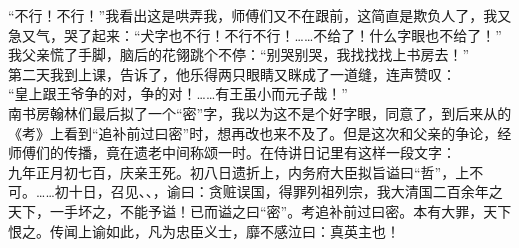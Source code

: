 “不行！不行！”我看出这是哄弄我，师傅们又不在跟前，这简直是欺负人了，我又急又气，哭了起来：“犬字也不行！不行不行！……不给了！什么字眼也不给了！”\\

我父亲慌了手脚，脑后的花翎跳个不停：“别哭别哭，我找找找上书房去！”\\

第二天我到上课，告诉了，他乐得两只眼睛又眯成了一道缝，连声赞叹：\\

“皇上跟王爷争的对，争的对！……有王虽小而元子哉！”\\

南书房翰林们最后拟了一个“密”字，我以为这不是个好字眼，同意了，到后来从的《考》上看到“追补前过曰密”时，想再改也来不及了。但是这次和父亲的争论，经师傅们的传播，竟在遗老中间称颂一时。在侍讲日记里有这样一段文字：\\

九年正月初七百，庆亲王死。初八日遗折上，内务府大臣拟旨谥曰“哲”，上不可。……初十日，召见、、，谕曰：贪赃误国，得罪列祖列宗，我大清国二百余年之天下，一手坏之，不能予谥！已而谥之曰“密”。考追补前过曰密。本有大罪，天下恨之。传闻上谕如此，凡为忠臣义士，靡不感泣曰：真英主也！
